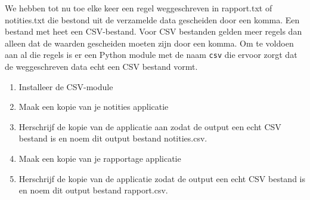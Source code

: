 We hebben tot nu toe elke keer een regel weggeschreven in rapport.txt of notities.txt die bestond uit de verzamelde data gescheiden door een komma. Een bestand met  heet een CSV-bestand. Voor CSV bestanden gelden meer regels dan alleen dat de waarden gescheiden moeten zijn door een komma. Om te voldoen aan al die regels is er een Python module met de naam \texttt{csv} die ervoor zorgt dat de weggeschreven data echt een CSV bestand vormt.

\begin{enumerate}
\item Installeer de CSV-module
\item Maak een kopie van je notities applicatie
\item Herschrijf de kopie van de applicatie aan zodat de output een echt CSV bestand is en noem dit output bestand notities.csv.
\item Maak een kopie van je rapportage applicatie
\item Herschrijf de kopie van de applicatie zodat de output een echt CSV bestand is en noem dit output bestand rapport.csv.
\end{enumerate}

